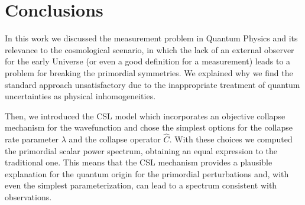 \documentclass[baaa]{baaa}
\begin{document}
\section{Conclusions}

In this work we discussed the measurement problem in Quantum Physics and its relevance to the cosmological scenario, in which the lack of an external observer for the early Universe (or even a good definition for a measurement) leads to a problem for breaking the primordial symmetries. We explained why we find the standard approach unsatisfactory due to the inappropriate treatment of quantum uncertainties as physical inhomogeneities.

Then, we introduced the CSL model which incorporates an objective collapse mechanism for the wavefunction and chose the simplest options for the collapse rate parameter $\lambda$ and the collapse operator $\hat{C}$. With these choices we computed the primordial scalar power spectrum, obtaining an equal expression to the traditional one. This means that the CSL mechanism provides a plausible explanation for the quantum origin for the primordial perturbations and, with even the simplest parameterization, can lead to a spectrum consistent with observations.



\end{document}
